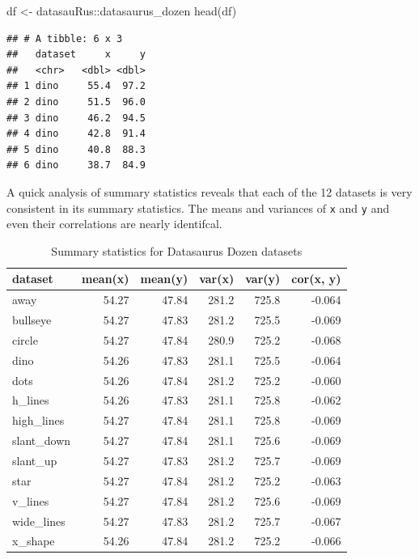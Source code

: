 \documentclass[
]{krantz}
\makeatletter
\newenvironment{Shaded}{\begin{snugshade}}{\end{snugshade}}
\newcommand{\FunctionTok}[1]{\textcolor[rgb]{0,0,0}{#1}}
\newcommand{\NormalTok}[1]{#1}
\newcommand{\OtherTok}[1]{\textcolor[rgb]{0.37,0.37,0.37}{#1}}
\newcommand{\SpecialCharTok}[1]{\textcolor[rgb]{0,0,0}{#1}}
\newenvironment{kframe}{%
\medskip{}
\setlength{\fboxsep}{.8em}
 \def\at@end@of@kframe{}%
 \ifinner\ifhmode%
  \def\at@end@of@kframe{\end{minipage}}%
  \begin{minipage}{\columnwidth}%
 \fi\fi%
 \def\FrameCommand##1{\hskip\@totalleftmargin \hskip-\fboxsep
 \colorbox{shadecolor}{##1}\hskip-\fboxsep
     \hskip-\linewidth \hskip-\@totalleftmargin \hskip\columnwidth}%
 \MakeFramed {\advance\hsize-\width
   \@totalleftmargin\z@ \linewidth\hsize
   \@setminipage}}%
 {\par\unskip\endMakeFramed%
 \at@end@of@kframe}
\renewenvironment{Shaded}{\begin{kframe}}{\end{kframe}}
\makeatother
\begin{document}
\begin{Shaded}
\begin{Highlighting}[]
\NormalTok{df }\OtherTok{\textless{}{-}}\NormalTok{ datasauRus}\SpecialCharTok{::}\NormalTok{datasaurus\_dozen}
\FunctionTok{head}\NormalTok{(df)}
\end{Highlighting}
\end{Shaded}

\begin{verbatim}
## # A tibble: 6 x 3
##   dataset     x     y
##   <chr>   <dbl> <dbl>
## 1 dino     55.4  97.2
## 2 dino     51.5  96.0
## 3 dino     46.2  94.5
## 4 dino     42.8  91.4
## 5 dino     40.8  88.3
## 6 dino     38.7  84.9
\end{verbatim}

A quick analysis of summary statistics reveals that each of the 12 datasets is very consistent in its summary statistics.
The means and variances of \texttt{x} and \texttt{y} and even their correlations are nearly identifcal.

\begin{table}

\caption{\label{tab:datasaurus-tbl}Summary statistics for Datasaurus Dozen datasets}
\centering
\begin{tabular}[t]{l|r|r|r|r|r}
\hline
dataset & mean(x) & mean(y) & var(x) & var(y) & cor(x, y)\\
\hline
away & 54.27 & 47.84 & 281.2 & 725.8 & -0.064\\
\hline
bullseye & 54.27 & 47.83 & 281.2 & 725.5 & -0.069\\
\hline
circle & 54.27 & 47.84 & 280.9 & 725.2 & -0.068\\
\hline
dino & 54.26 & 47.83 & 281.1 & 725.5 & -0.064\\
\hline
dots & 54.26 & 47.84 & 281.2 & 725.2 & -0.060\\
\hline
h\_lines & 54.26 & 47.83 & 281.1 & 725.8 & -0.062\\
\hline
high\_lines & 54.27 & 47.84 & 281.1 & 725.8 & -0.069\\
\hline
slant\_down & 54.27 & 47.84 & 281.1 & 725.6 & -0.069\\
\hline
slant\_up & 54.27 & 47.83 & 281.2 & 725.7 & -0.069\\
\hline
star & 54.27 & 47.84 & 281.2 & 725.2 & -0.063\\
\hline
v\_lines & 54.27 & 47.84 & 281.2 & 725.6 & -0.069\\
\hline
wide\_lines & 54.27 & 47.83 & 281.2 & 725.7 & -0.067\\
\hline
x\_shape & 54.26 & 47.84 & 281.2 & 725.2 & -0.066\\
\hline
\end{tabular}
\end{table}
\end{document}
